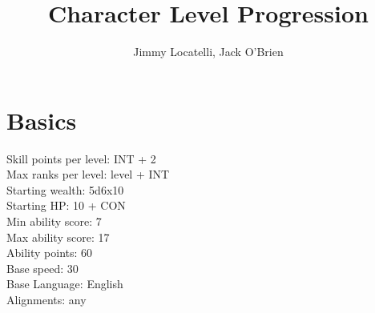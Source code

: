 \documentclass[12pt]{article}
\begin{document}
\title{Character Level Progression}
\author{Jimmy Locatelli, Jack O'Brien}
\maketitle



\section{Basics}

Skill points per level: INT + 2\\
Max ranks per level: level + INT\\
Starting wealth: 5d6x10\\
Starting HP: 10 + CON\\
Min ability score: 7\\
Max ability score: 17\\
Ability points: 60\\
Base speed: 30\\
Base Language: English\\
Alignments: any\\
\end{document}
